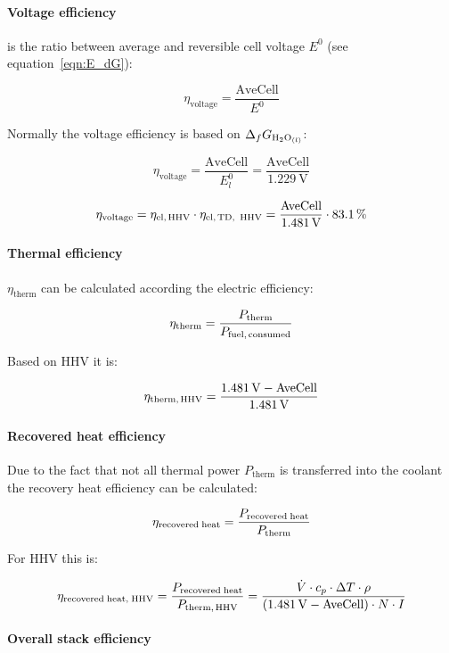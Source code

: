 \documentclass[11pt,a4paper,english,twoside]{scrreprt}
\begin{document}
\paragraph{Voltage efficiency}

is the ratio between average and reversible cell voltage $E^0$ (see equation~\ref{eqn:E_dG}):

\[
	\eta_{\text{voltage}} =\frac{\text{AveCell}}{E^0} 
\]

Normally the voltage efficiency is based on $\Delta_f G_{\ce{H2O}_{(l)}}$:

\[
	\eta_{\text{voltage}} =\frac{\text{AveCell}}{E_{l}^{0} } = \frac{\text{AveCell}}{\SI{1.229}{\volt}}
\]

\[
	\eta_{\text{voltage}} = \eta_{\text{el,\,HHV}} \cdot \eta_{\text{el,\,TD,\, HHV}}
	= \frac{\text{AveCell}}{\SI{1.481}{\volt}} \cdot \SI{83.1}{\percent}
\]



\paragraph{Thermal efficiency}

$\eta_{\text{therm}}$ can be calculated according the electric efficiency:

\[
	\eta_{\text{therm}} = \frac{P_{\text{therm}}}{P_{\text{fuel,\,consumed}}} 
\]


Based on HHV it is:

\[
	\eta_{\text{therm,\,HHV}} = \frac{\SI{1.481}{\volt} - \text{AveCell}}{\SI{1.481}{\volt}} 
\]



\paragraph{Recovered heat efficiency}

Due to the fact that not all thermal power $P_{\text{therm}}$ is transferred into the coolant the recovery heat efficiency can be calculated:

\[
	\eta_{\text{recovered\;heat}} = \frac{P_{\text{recovered\;heat}}}{P_{\text{therm}}} 
\]


For HHV this is:

\[
  \eta_{\text{recovered\;heat,\;HHV}} = \frac{P_{\text{recovered\;heat}}}{P_{\text{therm,\,HHV}}} 
	= \frac{\dot{V}\cdot c_{p} \cdot \Delta T\cdot \rho }{(\SI{1.481}{\volt} - \text{AveCell}) \cdot N \cdot I} 
\]



\paragraph{Overall stack efficiency}
\end{document}
